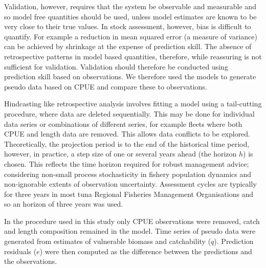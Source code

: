 \documentclass[12pt,halfline,a4paper,nonumbib]{ouparticle}
\begin{document}
Validation, however, requires that the system be observable and measurable and so model free quantities should be used, unless model estimates are known to be very close to their true values. In stock assessment, however, bias is difficult to quantify. For example a reduction in mean squared error (a measure of variance) can be achieved by shrinkage at the expense of prediction skill. The absence of retrospective patterns in model based quantities, therefore, while reassuring is not sufficient for validation. Validation should therefore be conducted using prediction skill based on observations. We therefore used the models to generate pseudo data based on CPUE and compare these to observations. 

Hindcasting like retrospective analysis involves fitting a model using a tail-cutting procedure, where data are deleted sequentially. This may be done for individual data series or combinations of different series, for example fleets where both CPUE and length data are removed. This allows data conflicts to be explored. Theoretically, the projection period is to the end of the historical time period, however, in practice, a step size of one or several years ahead (the horizon $h$) is chosen. This reflects the time horizon required for robust management advice; considering non-small process stochasticity in fishery population dynamics and non-ignorable extents of observation uncertainty. 
Assessment cycles are typically for three years in most tuna Regional Fisheries Management Organisations and so an horizon of three years was used.

In the procedure used in this study only CPUE observations were removed, catch and length composition remained in the model. Time series of pseudo data were generated from estimates of vulnerable biomass and catchability ($q$). Prediction residuals ($e$) were then computed as the difference between the predictions and the observations. %
\end{document}
